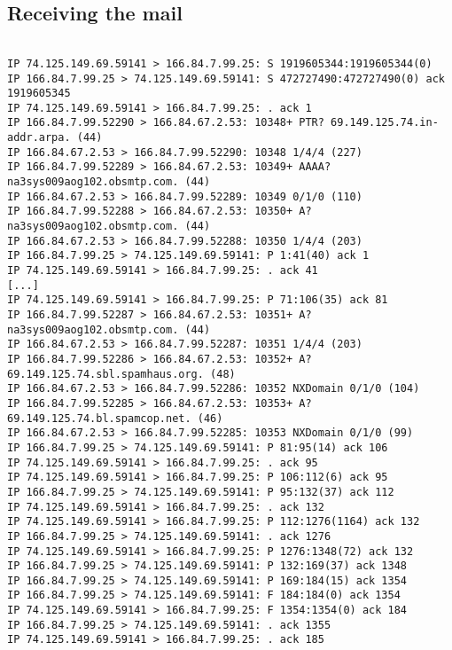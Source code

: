 \documentclass[xga]{xdvislides}
\begin{document}
\subsection{Receiving the mail}
\begin{verbatim}

IP 74.125.149.69.59141 > 166.84.7.99.25: S 1919605344:1919605344(0)
IP 166.84.7.99.25 > 74.125.149.69.59141: S 472727490:472727490(0) ack 1919605345
IP 74.125.149.69.59141 > 166.84.7.99.25: . ack 1
IP 166.84.7.99.52290 > 166.84.67.2.53: 10348+ PTR? 69.149.125.74.in-addr.arpa. (44)
IP 166.84.67.2.53 > 166.84.7.99.52290: 10348 1/4/4 (227)
IP 166.84.7.99.52289 > 166.84.67.2.53: 10349+ AAAA? na3sys009aog102.obsmtp.com. (44)
IP 166.84.67.2.53 > 166.84.7.99.52289: 10349 0/1/0 (110)
IP 166.84.7.99.52288 > 166.84.67.2.53: 10350+ A? na3sys009aog102.obsmtp.com. (44)
IP 166.84.67.2.53 > 166.84.7.99.52288: 10350 1/4/4 (203)
IP 166.84.7.99.25 > 74.125.149.69.59141: P 1:41(40) ack 1
IP 74.125.149.69.59141 > 166.84.7.99.25: . ack 41
[...]
IP 74.125.149.69.59141 > 166.84.7.99.25: P 71:106(35) ack 81
IP 166.84.7.99.52287 > 166.84.67.2.53: 10351+ A? na3sys009aog102.obsmtp.com. (44)
IP 166.84.67.2.53 > 166.84.7.99.52287: 10351 1/4/4 (203)
IP 166.84.7.99.52286 > 166.84.67.2.53: 10352+ A? 69.149.125.74.sbl.spamhaus.org. (48)
IP 166.84.67.2.53 > 166.84.7.99.52286: 10352 NXDomain 0/1/0 (104)
IP 166.84.7.99.52285 > 166.84.67.2.53: 10353+ A? 69.149.125.74.bl.spamcop.net. (46)
IP 166.84.67.2.53 > 166.84.7.99.52285: 10353 NXDomain 0/1/0 (99)
IP 166.84.7.99.25 > 74.125.149.69.59141: P 81:95(14) ack 106
IP 74.125.149.69.59141 > 166.84.7.99.25: . ack 95
IP 74.125.149.69.59141 > 166.84.7.99.25: P 106:112(6) ack 95
IP 166.84.7.99.25 > 74.125.149.69.59141: P 95:132(37) ack 112
IP 74.125.149.69.59141 > 166.84.7.99.25: . ack 132
IP 74.125.149.69.59141 > 166.84.7.99.25: P 112:1276(1164) ack 132
IP 166.84.7.99.25 > 74.125.149.69.59141: . ack 1276
IP 74.125.149.69.59141 > 166.84.7.99.25: P 1276:1348(72) ack 132
IP 166.84.7.99.25 > 74.125.149.69.59141: P 132:169(37) ack 1348
IP 166.84.7.99.25 > 74.125.149.69.59141: P 169:184(15) ack 1354
IP 166.84.7.99.25 > 74.125.149.69.59141: F 184:184(0) ack 1354
IP 74.125.149.69.59141 > 166.84.7.99.25: F 1354:1354(0) ack 184
IP 166.84.7.99.25 > 74.125.149.69.59141: . ack 1355
IP 74.125.149.69.59141 > 166.84.7.99.25: . ack 185
\end{verbatim}
\Normalsize
\end{document}
